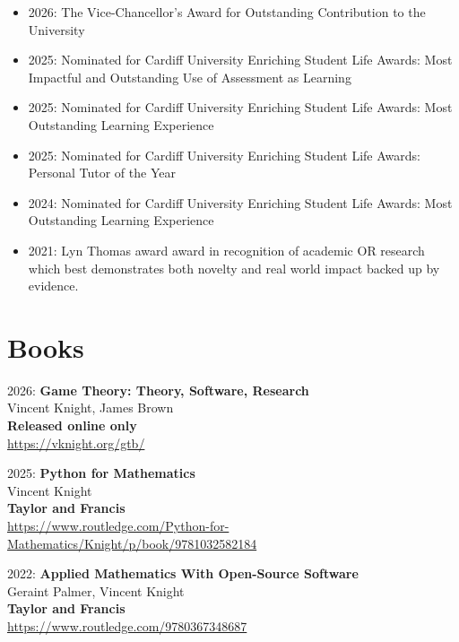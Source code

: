 \documentclass[10pt]{article}
\begin{document}
\begin{itemize}

  \item 2026: The Vice-Chancellor's Award for Outstanding Contribution to the University

  \item 2025: Nominated for Cardiff University Enriching Student Life Awards: Most Impactful and Outstanding Use of Assessment as Learning

  \item 2025: Nominated for Cardiff University Enriching Student Life Awards: Most Outstanding Learning Experience

  \item 2025: Nominated for Cardiff University Enriching Student Life Awards: Personal Tutor of the Year

  \item 2024: Nominated for Cardiff University Enriching Student Life Awards: Most Outstanding Learning Experience

  \item 2021: Lyn Thomas award award in recognition of academic OR research which best demonstrates both novelty and real world impact backed up by evidence.

\end{itemize}

\section{Books}

\begin{etaremune}

\item
  2026: \textbf{Game Theory: Theory, Software, Research}\\
  Vincent Knight, James Brown\\
  \textbf{Released online only}\\
  \url{https://vknight.org/gtb/}

\item
  2025: \textbf{Python for Mathematics}\\
  Vincent Knight\\
  \textbf{Taylor and Francis}\\
  \url{https://www.routledge.com/Python-for-Mathematics/Knight/p/book/9781032582184}

\item
  2022: \textbf{Applied Mathematics With Open-Source Software}\\
  Geraint Palmer, Vincent Knight\\
  \textbf{Taylor and Francis}\\
  \url{https://www.routledge.com/9780367348687}

\end{etaremune}
\end{document}

